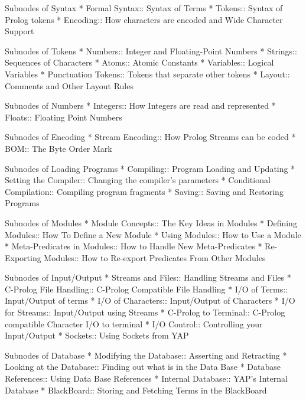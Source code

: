 Subnodes of Syntax
* Formal Syntax:: Syntax of Terms
* Tokens:: Syntax of Prolog tokens
* Encoding:: How characters are encoded and Wide Character Support

Subnodes of Tokens
* Numbers:: Integer and Floating-Point Numbers
* Strings:: Sequences of Characters
* Atoms:: Atomic Constants
* Variables:: Logical Variables
* Punctuation Tokens:: Tokens that separate other tokens
* Layout:: Comments and Other Layout Rules

Subnodes of Numbers
* Integers:: How Integers are read and represented
* Floats:: Floating Point Numbers

Subnodes of Encoding
* Stream Encoding:: How Prolog Streams can be coded
* BOM:: The Byte Order Mark

Subnodes of Loading Programs
* Compiling:: Program Loading and Updating
* Setting the Compiler:: Changing the compiler's parameters
* Conditional Compilation:: Compiling program fragments
* Saving:: Saving and Restoring Programs

Subnodes of Modules
* Module Concepts:: The Key Ideas in Modules
* Defining Modules:: How To Define a New Module
* Using Modules:: How to Use a Module
* Meta-Predicates in Modules:: How to Handle New Meta-Predicates
* Re-Exporting Modules:: How to Re-export Predicates From Other Modules

Subnodes of Input/Output
* Streams and Files:: Handling Streams and Files
* C-Prolog File Handling:: C-Prolog Compatible File Handling
* I/O of Terms:: Input/Output of terms
* I/O of Characters:: Input/Output of Characters
* I/O for Streams:: Input/Output using Streams
* C-Prolog to Terminal:: C-Prolog compatible Character I/O to terminal
* I/O Control:: Controlling your Input/Output
* Sockets:: Using Sockets from YAP

Subnodes of Database
* Modifying the Database:: Asserting and Retracting
* Looking at the Database:: Finding out what is in the Data Base
* Database References:: Using Data Base References
* Internal Database:: YAP's Internal Database
* BlackBoard:: Storing and Fetching Terms in the BlackBoard

